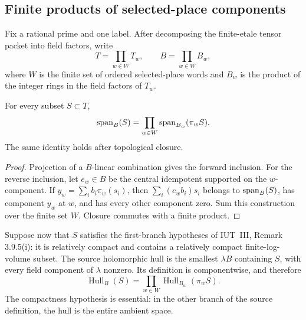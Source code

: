 \subsection{Finite products of selected-place components}

Fix a rational prime and one label.  After decomposing the finite-etale
tensor packet into field factors, write
\[
                         T=\prod_{w\in W}T_w,
             \qquad B=\prod_{w\in W}B_w,
\]
where $W$ is the finite set of ordered selected-place words and $B_w$ is the
product of the integer rings in the field factors of $T_w$.

\begin{proposition}\label{prop:new-product-span}
For every subset $S\subset T$,
\begin{equation}\label{eq:new-product-span}
       \operatorname{span}_B(S)=\prod_{w\in W}\operatorname{span}_{B_w}(\pi_wS).
\end{equation}
The same identity holds after topological closure.
\end{proposition}

\begin{proof}
Projection of a $B$-linear combination gives the forward inclusion.  For
the reverse inclusion, let $e_w\in B$ be the central idempotent supported on
the $w$-component.  If
$y_w=\sum_i b_i\pi_w(s_i)$, then
$\sum_i(e_wb_i)s_i$ belongs to $\operatorname{span}_B(S)$, has component $y_w$ at $w$,
and has every other component zero.  Sum this construction over the finite
set $W$.  Closure commutes with a finite product.
\end{proof}

Suppose now that $S$ satisfies the first-branch hypotheses of
IUT~III, Remark 3.9.5(i): it is relatively compact and contains a relatively
compact finite-log-volume subset.  The source holomorphic hull is the
smallest $\lambda B$ containing $S$, with every field component of $\lambda$
nonzero.  Its definition is componentwise, and therefore
\begin{equation}\label{eq:new-product-hull}
       \operatorname{Hull}_B(S)
       =\prod_{w\in W}\operatorname{Hull}_{B_w}(\pi_wS).
\end{equation}
The compactness hypothesis is essential: in the other branch of the source
definition, the hull is the entire ambient space.

